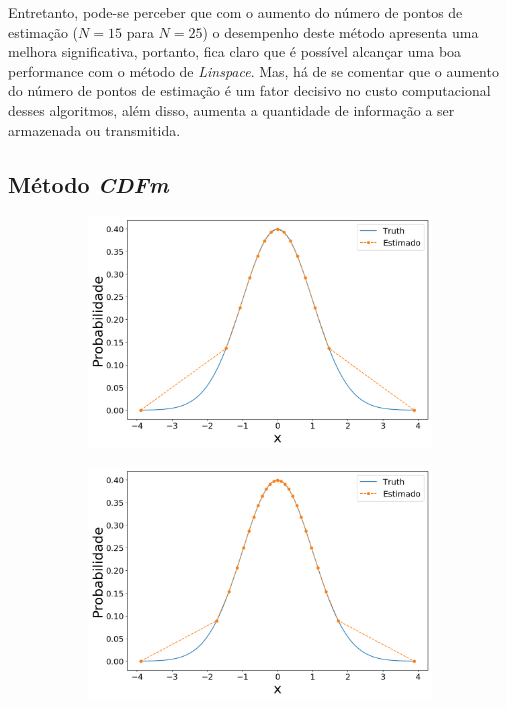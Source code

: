 Entretanto, pode-se perceber que com o aumento do número de pontos de estimação ($N = 15$ para $N = 25$) o desempenho deste método apresenta uma melhora significativa, portanto, fica claro que é possível alcançar uma boa performance com o método de \textit{Linspace}. Mas, há de se comentar que o aumento do número de pontos de estimação é um fator decisivo no custo computacional desses algoritmos, além disso, aumenta a quantidade de informação a ser armazenada ou transmitida.

\subsection{Método \textit{CDFm}}


\begin{figure}[H]
	\centering
	\begin{subfigure}[b]{0.45\textwidth}
		\centering 
		\includegraphics[width=\linewidth]{./figuras/CDFm_normal_15}
		\caption{}
		\label{fig:cdfnorm15}
	\end{subfigure}
	\hfill
	\begin{subfigure}[b]{0.45\textwidth}
		\centering 
		\includegraphics[width=\linewidth]{./figuras/CDFm_normal_25}
		\caption{}
		\label{fig:cdfnorm25}
	\end{subfigure}
	

\end{figure}
